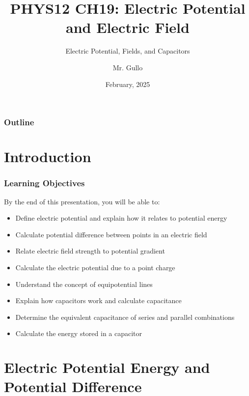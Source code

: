 \documentclass{beamer}
\title[Electric Potential \& Capacitors]{PHYS12 CH19: Electric Potential and Electric Field}
\subtitle{Electric Potential, Fields, and Capacitors}
\author[Mr. Gullo]{Mr. Gullo}
\date[Feb 2025]{February, 2025}
\institute{Physics Department}
\begin{document}
\begin{frame}
    \titlepage
\end{frame}

\begin{frame}
    \frametitle{Outline}
    \tableofcontents
\end{frame}

\section{Introduction}

\begin{frame}
    \frametitle{Learning Objectives}
    By the end of this presentation, you will be able to:
    \begin{itemize}
        \item Define electric potential and explain how it relates to potential energy
        \item Calculate potential difference between points in an electric field
        \item Relate electric field strength to potential gradient
        \item Calculate the electric potential due to a point charge
        \item Understand the concept of equipotential lines
        \item Explain how capacitors work and calculate capacitance
        \item Determine the equivalent capacitance of series and parallel combinations
        \item Calculate the energy stored in a capacitor
    \end{itemize}
\end{frame}

\section{Electric Potential Energy and Potential Difference}
\end{document}
